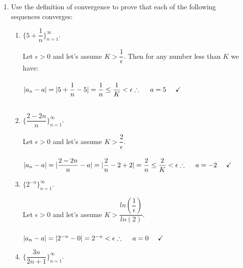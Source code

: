 \documentclass[fleqn]{article}
\begin{document}
\begin{enumerate}
    \item Use the definition of convergence to prove that each of the following sequences converges:
    \begin{enumerate}
      \item $\{5+\dfrac{1}{n}\}_{n=1}^{\infty}$.

        \textcolor{hwColor}{
          Let $\epsilon > 0$ and let's assume $K>\dfrac{1}{\epsilon}$. Then for any number less than $K$ we have:
          \\
          \\
          $
            |a_n-a|=|5+\dfrac{1}{n}-5|=\dfrac{1}{n} \leq \dfrac{1}{K} < \epsilon 
            \\
            \\
            \\
            \therefore ~~~~ a=5 ~~~~ \checkmark
          $
          \\
          \\
        }
      
      \item $\{\dfrac{2-2n}{n}\}_{n=1}^{\infty}$.

        \textcolor{hwColor}{
          Let $\epsilon > 0$ and let's assume $K>\dfrac{2}{\epsilon}$.
          \\
          \\
          $
            |a_n-a|=|\dfrac{2-2n}{n}-a|=|\dfrac{2}{n}-2+2|=\dfrac{2}{n} \leq \dfrac{2}{K}< \epsilon
            \\
            \\
            \\
            \therefore ~~~~ a=-2 ~~~~ \checkmark
          $
          \\
        }

      \item $\{2^{-n}\}_{n=1}^{\infty}$.

        \textcolor{hwColor}{
          Let $\epsilon > 0$ and let's assume $K>\dfrac{ln(\dfrac{1}{\epsilon})}{ln(2)}$.
          \\
          \\
          $
            |a_n-a|=|2^{-n}-0|=2^{-n} <\epsilon
            \\
            \\
            \\
            \therefore ~~~~ a=0 ~~~~ \checkmark
          $
          \\
        }

      \item $\{\dfrac{3n}{2n+1}\}_{n=1}^{\infty}$.


\end{enumerate}
\end{enumerate}
\end{document}

